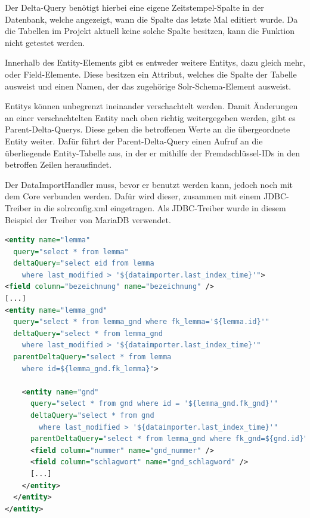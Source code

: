 Der Delta-Query benötigt hierbei eine eigene Zeitstempel-Spalte in der Datenbank, welche angezeigt, wann die Spalte das letzte Mal editiert wurde. Da die Tabellen im Projekt aktuell keine solche Spalte besitzen, kann die Funktion nicht getestet werden.

Innerhalb des Entity-Elements gibt es entweder weitere Entitys, dazu gleich mehr, oder Field-Elemente. Diese besitzen ein Attribut, welches die Spalte der Tabelle ausweist und einen Namen, der das zugehörige Solr-Schema-Element ausweist. 

Entitys können unbegrenzt ineinander verschachtelt werden. Damit Änderungen an einer verschachtelten Entity nach oben richtig weitergegeben werden, gibt es Parent-Delta-Querys. Diese geben die betroffenen Werte an die übergeordnete Entity weiter. Dafür führt der Parent-Delta-Query einen Aufruf an die überliegende Entity-Tabelle aus, in der er mithilfe der Fremdschlüssel-IDs in den betroffen Zeilen herausfindet.

Der DataImportHandler muss, bevor er benutzt werden kann, jedoch noch mit dem Core verbunden werden. Dafür wird dieser, zusammen mit einem JDBC-Treiber in die solrconfig.xml eingetragen. Als JDBC-Treiber wurde in diesem Beispiel der Treiber von MariaDB verwendet.

\begin{lstlisting}[language=xml, frame=single, label={lst:dih}, morekeywords={entity,query,deltaQuery,parentDeltaQuery,field,column, name}] 
<entity name="lemma" 
  query="select * from lemma" 
  deltaQuery="select eid from lemma 
    where last_modified > '${dataimporter.last_index_time}'"> 
<field column="bezeichnung" name="bezeichnung" />
[...]
<entity name="lemma_gnd" 
  query="select * from lemma_gnd where fk_lemma='${lemma.id}'"
  deltaQuery="select * from lemma_gnd 
    where last_modified > '${dataimporter.last_index_time}'"
  parentDeltaQuery="select * from lemma 
    where id=${lemma_gnd.fk_lemma}">
  
    <entity name="gnd" 
      query="select * from gnd where id = '${lemma_gnd.fk_gnd}'"
      deltaQuery="select * from gnd 
        where last_modified > '${dataimporter.last_index_time}'"
      parentDeltaQuery="select * from lemma_gnd where fk_gnd=${gnd.id}">
      <field column="nummer" name="gnd_nummer" />
      <field column="schlagwort" name="gnd_schlagword" />
      [...]
    </entity>
  </entity>  
</entity>
\end{lstlisting}


